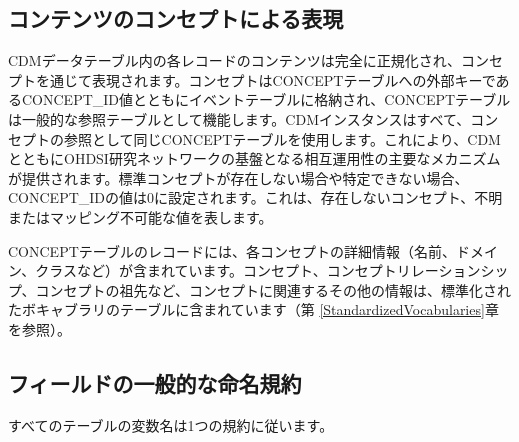 \documentclass[
  11pt]{book}
\theoremstyle{definition}
\theoremstyle{definition}
\theoremstyle{definition}
\theoremstyle{definition}
\theoremstyle{remark}
\begin{document}
\subsection{コンテンツのコンセプトによる表現}\label{ux30b3ux30f3ux30c6ux30f3ux30c4ux306eux30b3ux30f3ux30bbux30d7ux30c8ux306bux3088ux308bux8868ux73fe}

CDMデータテーブル内の各レコードのコンテンツは完全に正規化され、コンセプトを通じて表現されます。コンセプトはCONCEPTテーブルへの外部キーであるCONCEPT\_ID値とともにイベントテーブルに格納され、CONCEPTテーブルは一般的な参照テーブルとして機能します。CDMインスタンスはすべて、コンセプトの参照として同じCONCEPTテーブルを使用します。これにより、CDMとともにOHDSI研究ネットワークの基盤となる相互運用性の主要なメカニズムが提供されます。標準コンセプトが存在しない場合や特定できない場合、CONCEPT\_IDの値は0に設定されます。これは、存在しないコンセプト、不明またはマッピング不可能な値を表します。

CONCEPTテーブルのレコードには、各コンセプトの詳細情報（名前、ドメイン、クラスなど）が含まれています。コンセプト、コンセプトリレーションシップ、コンセプトの祖先など、コンセプトに関連するその他の情報は、標準化されたボキャブラリのテーブルに含まれています（第 \ref{StandardizedVocabularies}章を参照）。

\subsection{フィールドの一般的な命名規約}\label{ux30d5ux30a3ux30fcux30ebux30c9ux306eux4e00ux822cux7684ux306aux547dux540dux898fux7d04}

すべてのテーブルの変数名は1つの規約に従います。
\end{document}
